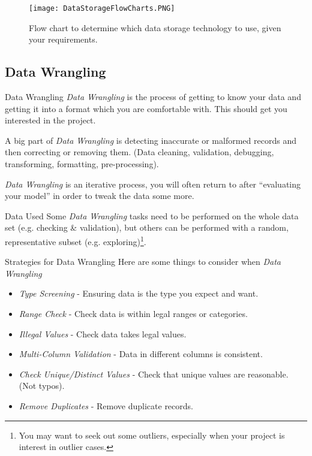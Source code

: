 \documentclass[11pt,a4paper]{article}
\begin{document}
  \begin{figure}[H]
    \centering
    \texttt{[image: DataStorageFlowCharts.PNG]}
    \caption{Flow chart to determine which data storage technology to use, given your requirements.}
    \label{fig_DataStorageFlowChart}
  \end{figure}

\subsection{Data Wrangling}

  \begin{definition}{Data Wrangling}
    \textit{Data Wrangling} is the process of getting to know your data and getting it into a format which you are comfortable with. This should get you interested in the project.
    \par A big part of \textit{Data Wrangling} is detecting inaccurate or malformed records and then correcting or removing them. (Data cleaning, validation, debugging, transforming, formatting, pre-processing).
    \par \textit{Data Wrangling} is an iterative process, you will often return to after ``evaluating your model'' in order to tweak the data some more.
  \end{definition}

  \begin{remark}{Data Used}
    Some \textit{Data Wrangling} tasks need to be performed on the whole data set (e.g. checking \& validation), but others can be performed with a random, representative subset (e.g. exploring)\footnote{You may want to seek out some outliers, especially when your project is interest in outlier cases.}.
  \end{remark}

  \begin{remark}{Strategies for Data Wrangling}
    Here are some things to consider when \textit{Data Wrangling}
    \begin{itemize}
      \item \textit{Type Screening} - Ensuring data is the type you expect and want.
      \item \textit{Range Check} - Check data is within legal ranges or categories.
      \item \textit{Illegal Values} - Check data takes legal values.
      \item \textit{Multi-Column Validation} - Data in different columns is consistent.
      \item \textit{Check Unique/Distinct Values} - Check that unique values are reasonable. (Not typos).
      \item \textit{Remove Duplicates} - Remove duplicate records.
    \end{itemize}
  \end{remark}
\end{document}
